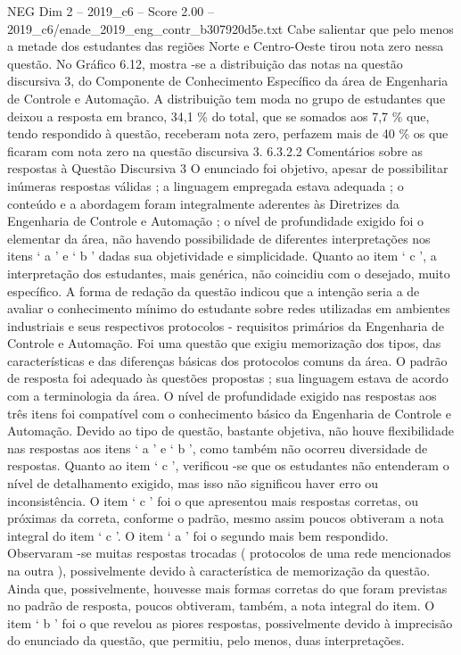 \begin{textsample}{NEG Dim 2 – 2019\_c6 – Score 2.00 – 2019\_c6/enade\_2019\_eng\_contr\_b307920d5e.txt}
Cabe salientar que pelo menos a metade dos estudantes das regiões Norte e Centro-Oeste tirou nota zero nessa questão.
No Gráfico 6.12, mostra -se a distribuição das notas na questão discursiva 3, do Componente de Conhecimento Específico da área de Engenharia de Controle e Automação.
A distribuição tem moda no grupo de estudantes que deixou a resposta em branco, 34,1 \% do total, que se somados aos 7,7 \% que, tendo respondido à questão, receberam nota zero, perfazem mais de 40 \% os que ficaram com nota zero na questão discursiva 3. 6.3.2.2 Comentários sobre as respostas à Questão Discursiva 3 O enunciado foi objetivo, apesar de possibilitar inúmeras respostas válidas ; a linguagem empregada estava adequada ; o conteúdo e a abordagem foram integralmente aderentes às Diretrizes da Engenharia de Controle e Automação ; o nível de profundidade exigido foi o elementar da área, não havendo possibilidade de diferentes interpretações nos itens ‘ a ’ e ‘ b ’ dadas sua objetividade e simplicidade.
Quanto ao item ‘ c ’, a interpretação dos estudantes, mais genérica, não coincidiu com o desejado, muito específico.
A forma de redação da questão indicou que a intenção seria a de avaliar o conhecimento mínimo do estudante sobre redes utilizadas em ambientes industriais e seus respectivos protocolos - requisitos primários da Engenharia de Controle e Automação.
Foi uma questão que exigiu memorização dos tipos, das características e das diferenças básicas dos protocolos comuns da área.
O padrão de resposta foi adequado às questões propostas ; sua linguagem estava de acordo com a terminologia da área.
O nível de profundidade exigido nas respostas aos três itens foi compatível com o conhecimento básico da Engenharia de Controle e Automação.
Devido ao tipo de questão, bastante objetiva, não houve flexibilidade nas respostas aos itens ‘ a ’ e ‘ b ’, como também não ocorreu diversidade de respostas.
Quanto ao item ‘ c ’, verificou -se que os estudantes não entenderam o nível de detalhamento exigido, mas isso não significou haver erro ou inconsistência.
O item ‘ c ’ foi o que apresentou mais respostas corretas, ou próximas da correta, conforme o padrão, mesmo assim poucos obtiveram a nota integral do item ‘ c ’.
O item ‘ a ’ foi o segundo mais bem respondido.
Observaram -se muitas respostas trocadas ( protocolos de uma rede mencionados na outra ), possivelmente devido à característica de memorização da questão.
Ainda que, possivelmente, houvesse mais formas corretas do que foram previstas no padrão de resposta, poucos obtiveram, também, a nota integral do item.
O item ‘ b ’ foi o que revelou as piores respostas, possivelmente devido à imprecisão do enunciado da questão, que permitiu, pelo menos, duas interpretações.

\end{textsample}
